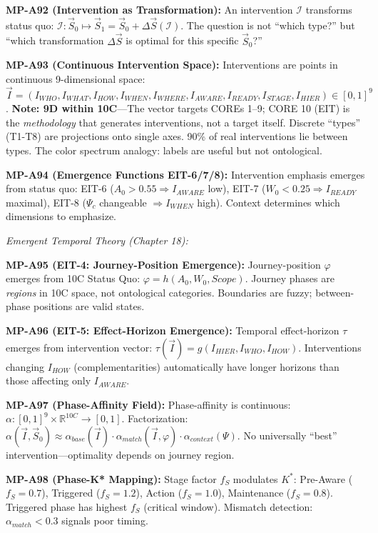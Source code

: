 \begin{tcolorbox}[colback=gray!5!white, colframe=gray!75!black,
    title=\textbf{MP Axioms}]
\textbf{MP-A92 (Intervention as Transformation):} An intervention $\mathcal{I}$ transforms status quo: $\mathcal{I}: \vec{S}_0 \mapsto \vec{S}_1 = \vec{S}_0 + \Delta\vec{S}(\mathcal{I})$. The question is not ``which type?'' but ``which transformation $\Delta\vec{S}$ is optimal for this specific $\vec{S}_0$?''

\textbf{MP-A93 (Continuous Intervention Space):} Interventions are points in continuous 9-dimensional space: $\vec{I} = (I_{WHO}, I_{WHAT}, I_{HOW}, I_{WHEN}, I_{WHERE}, I_{AWARE}, I_{READY}, I_{STAGE}, I_{HIER}) \in [0,1]^9$. \textbf{Note: 9D within 10C}---The vector targets COREs 1--9; CORE 10 (EIT) is the \textit{methodology} that generates interventions, not a target itself. Discrete ``types'' (T1-T8) are projections onto single axes. 90\% of real interventions lie between types. The color spectrum analogy: labels are useful but not ontological.

\textbf{MP-A94 (Emergence Functions EIT-6/7/8):} Intervention emphasis emerges from status quo: EIT-6 ($A_0 > 0.55 \Rightarrow I_{AWARE}$ low), EIT-7 ($W_0 < 0.25 \Rightarrow I_{READY}$ maximal), EIT-8 ($\Psi_c$ changeable $\Rightarrow I_{WHEN}$ high). Context determines which dimensions to emphasize.

\medskip
\textit{Emergent Temporal Theory (Chapter 18):}

\textbf{MP-A95 (EIT-4: Journey-Position Emergence):} Journey-position $\varphi$ emerges from 10C Status Quo: $\varphi = h(A_0, W_0, Scope)$. Journey phases are \textit{regions} in 10C space, not ontological categories. Boundaries are fuzzy; between-phase positions are valid states.

\textbf{MP-A96 (EIT-5: Effect-Horizon Emergence):} Temporal effect-horizon $\tau$ emerges from intervention vector: $\tau(\vec{I}) = g(I_{HIER}, I_{WHO}, I_{HOW})$. Interventions changing $I_{HOW}$ (complementarities) automatically have longer horizons than those affecting only $I_{AWARE}$.

\textbf{MP-A97 (Phase-Affinity Field):} Phase-affinity is continuous: $\alpha: [0,1]^9 \times \mathbb{R}^{10C} \to [0,1]$. Factorization: $\alpha(\vec{I}, \vec{S}_0) \approx \alpha_{base}(\vec{I}) \cdot \alpha_{match}(\vec{I}, \varphi) \cdot \alpha_{context}(\Psi)$. No universally ``best'' intervention---optimality depends on journey region.

\textbf{MP-A98 (Phase-K* Mapping):} Stage factor $f_S$ modulates $K^*$: Pre-Aware ($f_S = 0.7$), Triggered ($f_S = 1.2$), Action ($f_S = 1.0$), Maintenance ($f_S = 0.8$). Triggered phase has highest $f_S$ (critical window). Mismatch detection: $\alpha_{match} < 0.3$ signals poor timing.


\end{tcolorbox}
